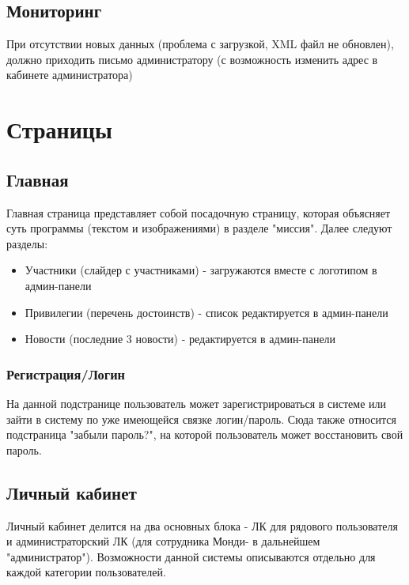 \documentclass[DIV=calc, paper=a4, fontsize=11pt]{scrartcl} %
\newcommand{\clientName}{Монди}
\begin{document}
\subsection{Мониторинг}
При отсутствии новых данных (проблема с загрузкой, XML файл не обновлен), должно приходить письмо администратору (с возможность изменить адрес в кабинете администратора)




\section{Страницы}

\subsection{Главная}

Главная страница представляет собой посадочную страницу, которая объясняет суть программы (текстом и изображениями) в разделе "миссия". Далее следуют разделы:

\begin{itemize}
	\item Участники (слайдер с участниками) - загружаются вместе с логотипом в админ-панели
	\item Привилегии (перечень достоинств) - список редактируется в админ-панели
	\item Новости (последние 3 новости) - редактируется в админ-панели
\end{itemize}

\subsubsection{Регистрация/Логин}
На данной подстранице пользователь может зарегистрироваться в системе или зайти в систему по уже имеющейся связке логин/пароль. Сюда также относится подстраница "забыли пароль?", на которой пользователь может восстановить свой пароль.

\subsection{Личный кабинет}

Личный кабинет делится на два основных блока - ЛК для рядового пользователя и администраторский ЛК (для сотрудника \clientName - в дальнейшем "администратор"). Возможности данной системы описываются отдельно для каждой категории пользователей.
\end{document}
